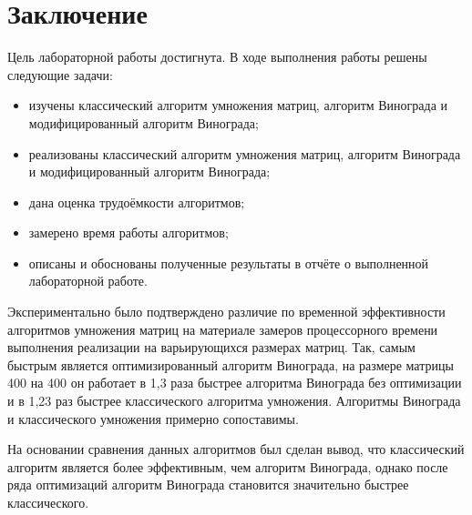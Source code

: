 \section{Заключение}
Цель лабораторной работы достигнута. В ходе выполнения работы решены следующие задачи:
\begin{itemize}
    \item изучены классический алгоритм умножения матриц, алгоритм Винограда и модифицированный алгоритм Винограда;
    \item реализованы классический алгоритм умножения матриц, алгоритм Винограда и модифицированный алгоритм Винограда;
    \item дана оценка трудоёмкости алгоритмов;
    \item замерено время работы алгоритмов;
    \item описаны и обоснованы полученные результаты в отчёте о выполненной лабораторной
работе.
\end{itemize}

Экспериментально было подтверждено различие по временной эффективности алгоритмов умножения матриц на материале замеров процессорного времени выполнения реализации на варьирующихся размерах матриц. Так, самым быстрым является оптимизированный алгоритм Винограда, на размере матрицы 400 на 400 он работает в 1,3 раза быстрее алгоритма Винограда без оптимизации и в 1,23 раз быстрее классического алгоритма умножения. Алгоритмы Винограда и классического умножения примерно сопоставимы.

На основании сравнения данных алгоритмов был сделан вывод, что классический алгоритм является более эффективным, чем алгоритм Винограда, однако после ряда оптимизаций алгоритм Винограда становится значительно быстрее классического. 